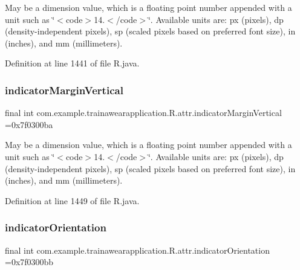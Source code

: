May be a dimension value, which is a floating point number appended with a unit such as \char`\"{}$<$code$>$14.\+5sp$<$/code$>$\char`\"{}. Available units are\+: px (pixels), dp (density-\/independent pixels), sp (scaled pixels based on preferred font size), in (inches), and mm (millimeters). 

Definition at line 1441 of file R.\+java.

\mbox{\label{classcom_1_1example_1_1trainawearapplication_1_1_r_1_1attr_a83df8b81af7cb1a0b0176af0b3dbe6ca}} 
\subsubsection{\texorpdfstring{indicatorMarginVertical}{indicatorMarginVertical}}
{\footnotesize\ttfamily final int com.\+example.\+trainawearapplication.\+R.\+attr.\+indicator\+Margin\+Vertical =0x7f0300ba\hspace{0.3cm}{\ttfamily [static]}}

May be a dimension value, which is a floating point number appended with a unit such as \char`\"{}$<$code$>$14.\+5sp$<$/code$>$\char`\"{}. Available units are\+: px (pixels), dp (density-\/independent pixels), sp (scaled pixels based on preferred font size), in (inches), and mm (millimeters). 

Definition at line 1449 of file R.\+java.

\mbox{\label{classcom_1_1example_1_1trainawearapplication_1_1_r_1_1attr_aa43a016e62b9a649d5ebd9772e9c59d6}} 
\subsubsection{\texorpdfstring{indicatorOrientation}{indicatorOrientation}}
{\footnotesize\ttfamily final int com.\+example.\+trainawearapplication.\+R.\+attr.\+indicator\+Orientation =0x7f0300bb\hspace{0.3cm}{\ttfamily [static]}}

